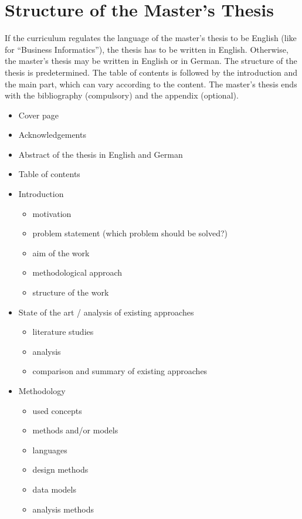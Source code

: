 \section{Structure of the Master's Thesis}

If the curriculum regulates the language of the master's thesis to be English (like for ``Business Informatics''), the thesis has to be written in English. Otherwise, the master's thesis may be written in English or in German. The structure of the thesis is predetermined.
The table of contents is followed by the introduction and the main part, which can vary according to the content. The master's thesis ends with the bibliography (compulsory) and the appendix (optional).

\begin{itemize}
  \item	Cover page
  \item Acknowledgements
  \item Abstract of the thesis in English and German
  \item Table of contents
  \item Introduction
  	\begin{itemize}
  		\item motivation
  		\item problem statement (which problem should be solved?)
  		\item aim of the work
  		\item methodological approach
  		\item structure of the work
  	\end{itemize}
  \item State of the art / analysis of existing approaches
  	\begin{itemize}
  		\item literature studies
  		\item analysis
  		\item comparison and summary of existing approaches
  	\end{itemize}
  \item Methodology
  	\begin{itemize}
  		\item used concepts
  		\item methods and/or models
  		\item languages
  		\item design methods
  		\item data models
  		\item analysis methods

\end{itemize}
\end{itemize}
